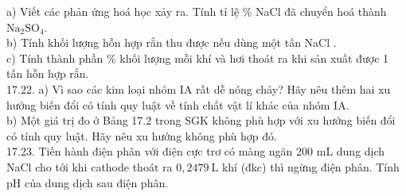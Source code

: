\documentclass[10pt]{article}
\begin{document}
a) Viết các phản ứng hoá học xảy ra. Tính tỉ lệ \% NaCl đã chuyển hoá thành $\mathrm{Na}_{2} \mathrm{SO}_{4}$.\\
b) Tính khối lượng hỗn hợp rắn thu được nếu dùng một tấn NaCl .\\
c) Tính thành phần \% khối lượng mỗi khí và hơi thoát ra khi sản xuất được 1 tấn hỗn hợp rắn.\\
17.22. a) Vì sao các kim loại nhóm IA rất dễ nóng chảy? Hãy nêu thêm hai xu hướng biến đổi có tính quy luật về tính chất vật lí khác của nhóm IA.\\
b) Một giá trị đo ở Bảng 17.2 trong SGK không phù hợp với xu hướng biến đổi có tính quy luật. Hãy nêu xu hướng không phù hợp đó.\\
17.23. Tiến hành điện phân với điện cực trơ có màng ngăn 200 mL dung dịch NaCl cho tới khi cathode thoát ra $0,2479 \mathrm{~L}$ khí (đkc) thì ngừng điện phân. Tính pH của dung dịch sau điện phân.
\end{document}

